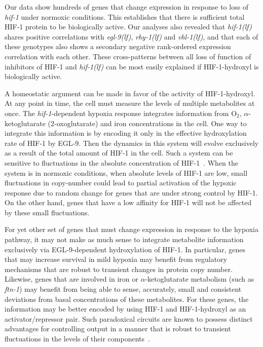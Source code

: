 \documentclass[9pt,twocolumn,twoside]{pnas-new}
\newcommand{\gene}[1]{\emph{#1}}
\newcommand{\ftna}{\emph{ftn-1}}
\newcommand{\egl}{\emph{egl-9(lf)}}
\newcommand{\rhy}{\emph{rhy-1(lf)}}
\newcommand{\vhl}{\emph{vhl-1(lf)}}
\newcommand{\hif}{\emph{hif-1(lf)}}
\newcommand{\eglp}{EGL-9}
\newcommand{\hifp}{HIF-1}
\begin{document}
Our data show hundreds of genes that change expression in response
to loss of \gene{hif-1} under normoxic conditions. This establishes that there is
sufficient total \hifp{} protein to be biologically active.
Our analyses also revealed that \hif{} shares
positive correlations with \egl{}, \rhy{} and \vhl{}, and that each of these genotypes
also shows a secondary negative rank-ordered expression correlation with each other.
These cross-patterns between all loss of function of inhibitors of \hifp{} and
\hif{} can be most easily explained if \hifp{}-hydroxyl is biologically active.

A homeostatic argument can be made in favor of the activity of \hifp{}-hydroxyl.
At any point in time, the cell must measure the levels of
multiple metabolites at once. The \gene{hif-1}-dependent hypoxia
response integrates information from O$_2$, $\alpha$-ketoglutarate
(2-oxoglutarate) and iron concentrations in the cell. One way to
integrate this information is by encoding it only in the effective hydroxylation
rate of \hifp{} by \eglp{}. Then the dynamics in this system will evolve
exclusively as a result of the total amount of \hifp{} in the cell. Such a system
can be sensitive to fluctuations in the absolute concentration of
\hifp{}~\cite{Goentoro2009a}. When the system is in normoxic conditions, when
absolute levels of \hifp{} are low, small fluctuations in copy-number could lead
to partial activation of the hypoxic response due to random change for genes
that are under strong control by \hifp{}. On the other hand, genes that have a low
affinity for \hifp{} will not be affected by these small fluctuations.

For yet other set of genes that must change expression in response to the hypoxia
pathway, it may not make as much sense to integrate metabolite information
exclusively via \eglp{}-dependent hydroxylation of \hifp{}. In particular, genes
that may increase survival in mild hypoxia may benefit from regulatory mechanisms
that are robust to transient changes in protein copy number. Likewise,
genes that are involved in iron or $\alpha$-ketoglutarate metabolism
(such as \ftna{}) may benefit from being able to sense, accurately, small and
consistent deviations from basal concentrations of these metabolites. For these
genes, the information may be better encoded by using \hifp{} and
\hifp{}-hydroxyl as an activator/repressor pair. Such paradoxical circuits are
known to possess distinct advantages for controlling output in a manner that
is robust to transient fluctuations in the levels of their
components~\cite{Hart2012,Hart2013}.
\end{document}
